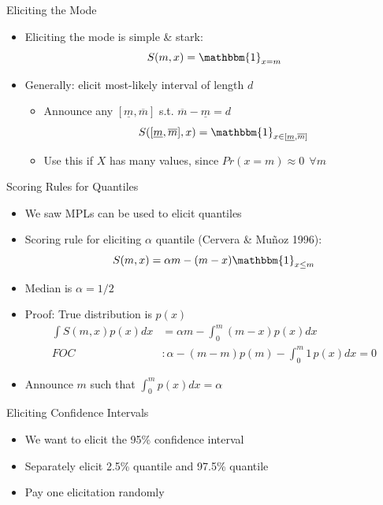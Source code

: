 \begin{frame}{Eliciting the Mode}
\begin{itemize}
    \item Eliciting the mode is simple \& stark:
    $$
        S(m,x) = \mathbbm{1}_{x=m}
    $$
    \item Generally: elicit most-likely interval of length $d$
    \begin{itemize}
        \item Announce any $[\underline{m},\overline{m}]$ s.t. $\overline{m}-\underline{m}=d$
        $$
            S([\underline{m},\overline{m}],x) = \mathbbm{1}_{x\in [\underline{m},\overline{m}]}
        $$
        \item Use this if $X$ has many values, since $Pr(x=m)\approx 0\ \ \forall m$
    \end{itemize}
\end{itemize}    
\end{frame}

\begin{frame}{Scoring Rules for Quantiles}
\begin{itemize}
    \item We saw MPLs can be used to elicit quantiles
    \item Scoring rule for eliciting $\alpha$ quantile (Cervera \& Mu\~{n}oz 1996):
    $$
        S(m,x) = \alpha m - (m-x)\mathbbm{1}_{x\leq m}
    $$
    \item Median is $\alpha=1/2$
    \item Proof: True distribution is $p(x)$
    \begin{align*}
        \int S(m,x) p(x) dx &= \alpha m - \int_0^m (m-x) p(x) dx \\
        FOC &: \alpha - (m-m)p(m) - \int_0^m 1\, p(x) dx = 0
    \end{align*}
    \item Announce $m$ such that $\int_0^m p(x)dx = \alpha$
\end{itemize}
    
\end{frame}

\begin{frame}{Eliciting Confidence Intervals}
\begin{itemize}
    \item We want to elicit the 95\% confidence interval
    \item Separately elicit 2.5\% quantile and 97.5\% quantile
    \item Pay one elicitation randomly
\end{itemize}
\end{frame}

